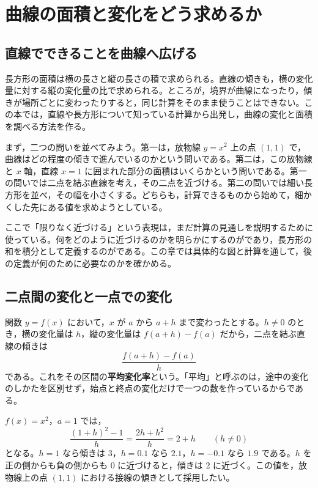\chapter{曲線の面積と変化をどう求めるか}\label{章:導入}
\section{直線でできることを曲線へ広げる}
長方形の面積は横の長さと縦の長さの積で求められる。直線の傾きも，横の変化量に対する縦の変化量の比で求められる。ところが，境界が曲線になったり，傾きが場所ごとに変わったりすると，同じ計算をそのまま使うことはできない。この本では，直線や長方形について知っている計算から出発し，曲線の変化と面積を調べる方法を作る。

まず，二つの問いを並べてみよう。第一は，放物線 $y=x^2$ 上の点 $(1,1)$ で，曲線はどの程度の傾きで進んでいるのかという問いである。第二は，この放物線と $x$ 軸，直線 $x=1$ に囲まれた部分の面積はいくらかという問いである。第一の問いでは二点を結ぶ直線を考え，その二点を近づける。第二の問いでは細い長方形を並べ，その幅を小さくする。どちらも，計算できるものから始めて，細かくした先にある値を求めようとしている。

ここで「限りなく近づける」という表現は，まだ計算の見通しを説明するために使っている。何をどのように近づけるのかを明らかにするのがであり，長方形の和を積分として定義するのがである。この章では具体的な図と計算を通して，後の定義が何のために必要なのかを確かめる。

\section{二点間の変化と一点での変化}\label{節:導入変化}
関数 $y=f(x)$ において，$x$ が $a$ から $a+h$ まで変わったとする。$h\ne0$ のとき，横の変化量は $h$，縦の変化量は $f(a+h)-f(a)$ だから，二点を結ぶ直線の傾きは
\[
 \frac{f(a+h)-f(a)}{h}
\]
である。これをその区間の\textbf{平均変化率}という。「平均」と呼ぶのは，途中の変化のしかたを区別せず，始点と終点の変化だけで一つの数を作っているからである。

$f(x)=x^2$，$a=1$ では，
\[
 \frac{(1+h)^2-1}{h}
 =\frac{2h+h^2}{h}=2+h \qquad(h\ne0)
\]
となる。$h=1$ なら傾きは $3$，$h=0.1$ なら $2.1$，$h=-0.1$ なら $1.9$ である。$h$ を正の側からも負の側からも $0$ に近づけると，傾きは $2$ に近づく。この値を，放物線上の点 $(1,1)$ における接線の傾きとして採用したい。

